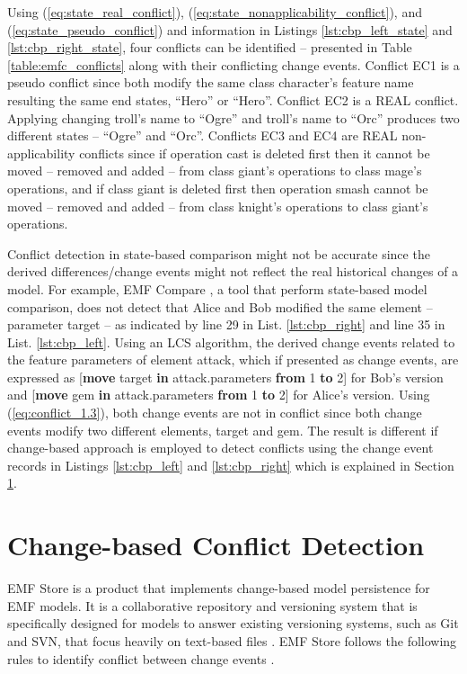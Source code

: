 Using (\ref{eq:state_real_conflict}), (\ref{eq:state_nonapplicability_conflict}), and (\ref{eq:state_pseudo_conflict}) and information in Listings \ref{lst:cbp_left_state} and \ref{lst:cbp_right_state}, four conflicts can be identified -- presented in Table \ref{table:emfc_conflicts} along with their conflicting change events. Conflict \textsf{EC1} is a \textsf{pseudo} conflict since both modify the same class \textsf{character}'s feature \textsf{name} resulting the same end states, ``Hero'' or ``Hero''. Conflict \textsf{EC2} is a \textsf{REAL} conflict. Applying changing \textsf{troll}'s \textsf{name} to ``Ogre'' and \textsf{troll}'s \textsf{name} to ``Orc'' produces two different states -- ``Ogre'' and ``Orc''. Conflicts \textsf{EC3} and \textsf{EC4} are \textsf{REAL} non-applicability conflicts since if operation \textsf{cast} is deleted first then it cannot be moved -- removed and added -- from class \textsf{giant}'s \textsf{operations} to class \textsf{mage}'s \textsf{operations}, and if class \textsf{giant} is deleted first then operation \textsf{smash} cannot be moved -- removed and added -- from  class \textsf{knight}'s \textsf{operations} to class \textsf{giant}'s \textsf{operations}.

Conflict detection in state-based comparison might not be accurate since the derived differences/change events might not reflect the real historical changes of a model. For example, EMF Compare \cite{emfcompare2018developer}, a tool that perform state-based model comparison, does not detect that Alice and Bob modified the same element -- parameter \textsf{target} -- as indicated by line 29 in List. \ref{lst:cbp_right} and line 35 in List. \ref{lst:cbp_left}. Using an LCS algorithm, the derived change events related to the feature \textsf{parameters} of element \textsf{attack}, which if presented as change events, are expressed as [\textsf{\small \textbf{move} target \textbf{in} attack.parameters \textbf{from} 1 \textbf{to} 2}] for Bob's version and [\textsf{\small \textbf{move} gem \textbf{in} attack.parameters \textbf{from} 1 \textbf{to} 2}] for Alice's version. Using (\ref{eq:conflict_1.3}), both change events are not in conflict since both change events modify two different elements, \textsf{target} and \textsf{gem}. The result is different if change-based approach is employed to detect conflicts using the change event records in Listings \ref{lst:cbp_left} and \ref{lst:cbp_right} which is explained in Section \ref{sec:emfstore_conflict_detection}.

\section{Change-based Conflict Detection}
\label{sec:emfstore_conflict_detection}
EMF Store \cite{koegel2010emfstore} is a product that implements change-based model persistence for EMF models. It is a collaborative repository and versioning system that is specifically designed for models to answer existing versioning systems, such as Git and SVN, that focus heavily on text-based files \cite{emfstore2019what}. EMF Store follows the following rules to identify conflict between change events \cite{koegel2010operation}. 

